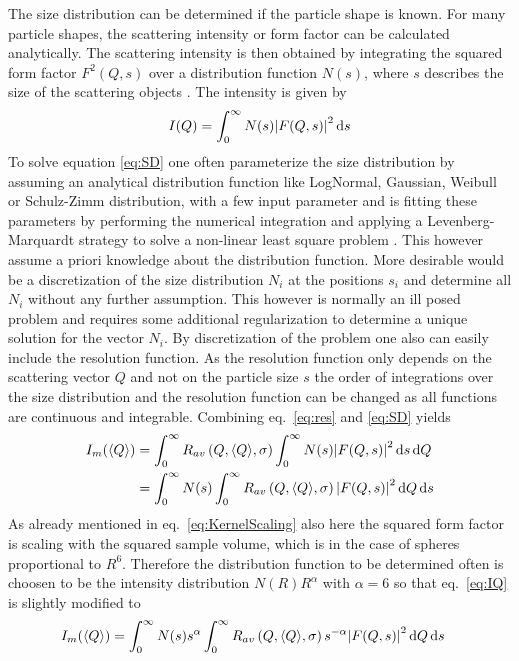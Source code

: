 The size distribution can be determined if the particle shape is known. For many particle shapes, the scattering intensity or form factor can be calculated analytically. The scattering intensity is then obtained by integrating the squared form factor $F^2(Q,s)$ over a distribution function $N(s)$, where $s$ describes the size of the scattering objects \cite{Pedersen1997}. The intensity is given by
\begin{equation} \label{eq:SD}
I(Q) = \int_0^\infty N(s) {\left\vert F(Q,s)\right\vert}^2 \, \mathrm{d}s
\end{equation}
To solve equation \ref{eq:SD} one often parameterize the size distribution by assuming an analytical distribution function like LogNormal, Gaussian, Weibull or Schulz-Zimm distribution, with a few input parameter and is fitting these parameters by performing the numerical integration and applying a Levenberg-Marquardt strategy to solve a non-linear least square problem \cite{Bressler2015}. This however assume a priori knowledge about the distribution function. More desirable would be a discretization of the size distribution $N_i$ at the positions $s_i$ and determine all $N_i$ without any further assumption. This however is normally an ill posed problem and requires some additional regularization to determine a unique solution for the vector $N_i$. By discretization of the problem one also can easily include the resolution function. As the resolution function only depends on the scattering vector $Q$ and not on the particle size $s$ the order of integrations over the size distribution and the resolution function can be changed as all functions are continuous and integrable. Combining eq.\ \ref{eq:res} and \ref{eq:SD} yields
\begin{align}
I_m(\langle Q\rangle) &= \int_0^\infty R_{av}\left(Q,\langle
Q\rangle,\sigma\right)  \int_0^\infty N(s) {\left\vert F(Q,s)\right\vert}^2 \, \mathrm{d}s \, \mathrm{d}Q \\
&= \int_0^\infty N(s)  \int_0^\infty R_{av}\left(Q,\langle
Q\rangle,\sigma\right) {\left\vert F(Q,s)\right\vert}^2 \, \mathrm{d}Q \, \mathrm{d}s \label{eq:IQ}
\end{align}
As already mentioned in eq.\ \ref{eq:KernelScaling} also here the squared form factor is scaling with the squared sample volume, which is in the case of spheres proportional to $R^6$. Therefore the distribution function to be determined often is choosen to be the intensity distribution $N(R)R^\alpha$ with $\alpha=6$ so that eq.\ \ref{eq:IQ} is slightly modified to
\begin{align}
I_m(\langle Q\rangle) &=  \int_0^\infty N(s)s^\alpha  \int_0^\infty R_{av}\left(Q,\langle
Q\rangle,\sigma\right) s^{-\alpha}{\left\vert F(Q,s)\right\vert}^2 \, \mathrm{d}Q \, \mathrm{d}s
\end{align}
